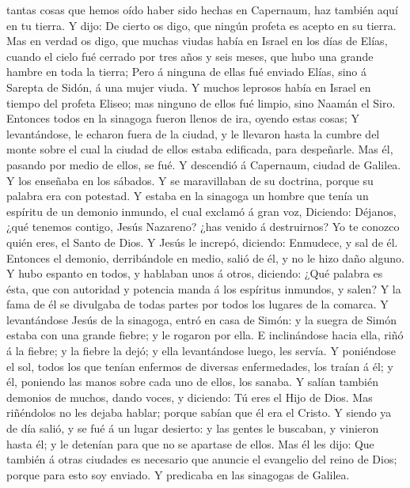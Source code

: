 tantas cosas que hemos oído haber sido hechas en Capernaum, haz también
aquí en tu tierra.  Y dijo: De cierto os digo, que ningún
profeta es acepto en su tierra.  Mas en verdad os digo,
que muchas viudas había en Israel en los días de Elías, cuando el cielo
fué cerrado por tres años y seis meses, que hubo una grande hambre en
toda la tierra;  Pero á ninguna de ellas fué enviado
Elías, sino á Sarepta de Sidón, á una mujer viuda.  Y
muchos leprosos había en Israel en tiempo del profeta Eliseo; mas
ninguno de ellos fué limpio, sino Naamán el Siro. 
Entonces todos en la sinagoga fueron llenos de ira, oyendo estas cosas;
 Y levantándose, le echaron fuera de la ciudad, y le
llevaron hasta la cumbre del monte sobre el cual la ciudad de ellos
estaba edificada, para despeñarle.  Mas él, pasando por
medio de ellos, se fué.  Y descendió á Capernaum, ciudad
de Galilea. Y los enseñaba en los sábados.  Y se
maravillaban de su doctrina, porque su palabra era con potestad.
 Y estaba en la sinagoga un hombre que tenía un espíritu
de un demonio inmundo, el cual exclamó á gran voz, 
Diciendo: Déjanos, ¿qué tenemos contigo, Jesús Nazareno? ¿has venido á
destruirnos? Yo te conozco quién eres, el Santo de Dios. 
Y Jesús le increpó, diciendo: Enmudece, y sal de él. Entonces el
demonio, derribándole en medio, salió de él, y no le hizo daño alguno.
 Y hubo espanto en todos, y hablaban unos á otros,
diciendo: ¿Qué palabra es ésta, que con autoridad y potencia manda á los
espíritus inmundos, y salen?  Y la fama de él se
divulgaba de todas partes por todos los lugares de la comarca.
 Y levantándose Jesús de la sinagoga, entró en casa de
Simón: y la suegra de Simón estaba con una grande fiebre; y le rogaron
por ella.  E inclinándose hacia ella, riñó á la fiebre; y
la fiebre la dejó; y ella levantándose luego, les servía.
 Y poniéndose el sol, todos los que tenían enfermos de
diversas enfermedades, los traían á él; y él, poniendo las manos sobre
cada uno de ellos, los sanaba.  Y salían también demonios
de muchos, dando voces, y diciendo: Tú eres el Hijo de Dios. Mas
riñéndolos no les dejaba hablar; porque sabían que él era el Cristo.
 Y siendo ya de día salió, y se fué á un lugar desierto:
y las gentes le buscaban, y vinieron hasta él; y le detenían para que no
se apartase de ellos.  Mas él les dijo: Que también á
otras ciudades es necesario que anuncie el evangelio del reino de Dios;
porque para esto soy enviado.  Y predicaba en las
sinagogas de Galilea.

